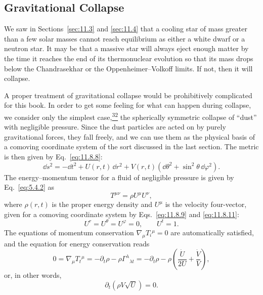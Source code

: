 
\subsection{Gravitational Collapse}\label{sec:11.9}

We saw in Sections~\ref{sec:11.3} and \ref{sec:11.4} that a cooling star of
mass greater than a few solar masses cannot reach equilibrium as either a
white dwarf or a neutron star. It may be that a massive star will always
eject enough matter by the time it reaches the end of its thermonuclear
evolution so that its mass drops below the Chandrasekhar or the
Oppenheimer--Volkoff limits. If not, then it will collapse.

A proper treatment of gravitational collapse would be prohibitively
complicated for this book. In order to get some feeling for what can happen
during collapse, we consider only the simplest
case,\hyperref[ch11-ref-32]{\textsuperscript{32}} the spherically symmetric
collapse of ``dust'' with negligible pressure. Since the dust particles are
acted on by purely gravitational forces, they fall freely, and we can use them
as the physical basis of a comoving coordinate system of the sort discussed
in the last section. The metric is then given by Eq.~\eqref{eq:11.8.8}:
\begin{equation}
  \dd s^2
  =
  -\dd t^2+U(r,t)\,\dd r^2
  +V(r,t)(\dd\theta^2+\sin^2\theta\,\dd\varphi^2).
  \tag{11.9.1}\label{eq:11.9.1}
\end{equation}
The energy--momentum tensor for a fluid of negligible pressure is given by
Eq.~\eqref{eq:5.4.2} as
\begin{equation}
  T^{\mu\nu}=\rho U^\mu U^\nu,
  \tag{11.9.2}\label{eq:11.9.2}
\end{equation}
where \(\rho(r,t)\) is the proper energy density and \(U^\mu\) is the velocity
four-vector, given for a comoving coordinate system by
Eqs.~\eqref{eq:11.8.9} and \eqref{eq:11.8.11}:
\begin{equation}
  U^r=U^\theta=U^\varphi=0,\qquad U^t=1.
  \tag{11.9.3}\label{eq:11.9.3}
\end{equation}
The equations of momentum conservation
\(\nabla_\mu T_i{}^\mu=0\) are automatically satisfied, and the equation for
energy conservation reads
\[
  0=\nabla_\mu T_t{}^\mu
  =
  -\partial_t\rho-\rho\Gamma^\lambda{}_{\lambda t}
  =
  -\partial_t\rho
  -\rho\left(\frac{\dot U}{2U}+\frac{\dot V}{V}\right),
\]
or, in other words,
\begin{equation}
  \partial_t\!\left(\rho V\sqrt U\right)=0.
  \tag{11.9.4}\label{eq:11.9.4}
\end{equation}


